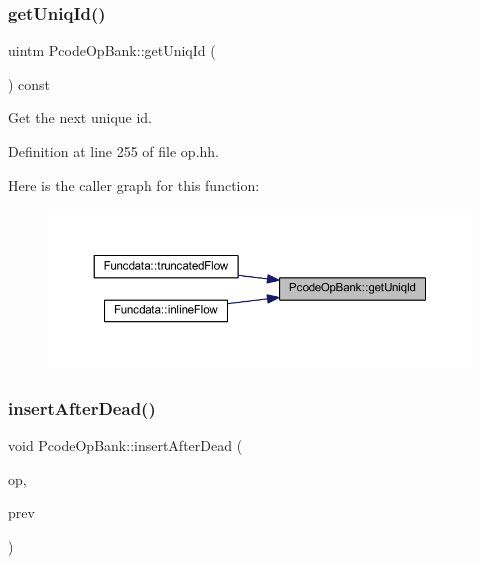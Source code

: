 \subsubsection{\texorpdfstring{getUniqId()}{getUniqId()}}
{\footnotesize\ttfamily uintm Pcode\+Op\+Bank\+::get\+Uniq\+Id (\begin{DoxyParamCaption}\item[{void}]{ }\end{DoxyParamCaption}) const\hspace{0.3cm}{\ttfamily [inline]}}



Get the next unique id. 



Definition at line 255 of file op.\+hh.

Here is the caller graph for this function\+:
\nopagebreak
\begin{figure}[H]
\begin{center}
\leavevmode
\includegraphics[width=350pt]{class_pcode_op_bank_a54e8b50b4b4c2fa1e4c4aa80d3cd6588_icgraph}
\end{center}
\end{figure}
\mbox{\label{class_pcode_op_bank_aa1387fcf35d7e84e888f07c4cb167d65}} 
\subsubsection{\texorpdfstring{insertAfterDead()}{insertAfterDead()}}
{\footnotesize\ttfamily void Pcode\+Op\+Bank\+::insert\+After\+Dead (\begin{DoxyParamCaption}\item[{\mbox{\hyperlink{class_pcode_op}{Pcode\+Op}} $\ast$}]{op,  }\item[{\mbox{\hyperlink{class_pcode_op}{Pcode\+Op}} $\ast$}]{prev }\end{DoxyParamCaption})}




